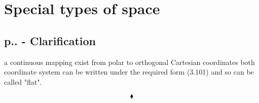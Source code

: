 \chapter{Special types of space}
\pagebreak[4]
\section{p.. - Clarification}
\begin{tcolorbox}
\end{tcolorbox}
a continuous mapping exist from polar to orthogonal Cartesian coordinates both  coordinate system can be written under the required form (3.101) and so can be called "flat".

$$\blacklozenge$$
\newpage